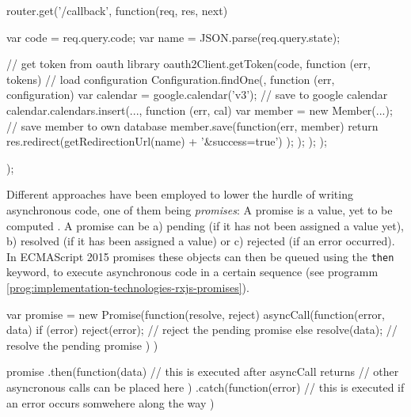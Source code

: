 \begin{program}
\caption{\emph{Callback Hell} -- Nested callbacks in JavaScript. Simplified method taken from a previous project, which authenticates a user, creates a new google calendar for them and then saves the user to one\'s own database, to then redirect them. \texttt{\{...\}} is used to shorten the code, error-handling was also omitted in the example for simplicity.}
\label{prog:implementation-technologies-rxjs-callback-hell}
\begin{JsCode}
router.get('/callback', function(req, res, next) {
  var code = req.query.code;
  var name = JSON.parse(req.query.state);

  // get token from oauth library
  oauth2Client.getToken(code, function (err, tokens) {
    // load configuration
    Configuration.findOne({}, function (err, configuration) {
      var calendar = google.calendar('v3');
      // save to google calendar
      calendar.calendars.insert({...}, function (err, cal) {
        var member = new Member({...});
        // save member to own database
        member.save(function(err, member) {
          return res.redirect(getRedirectionUrl(name) + '&success=true')
        });
      });
    });
  });
});
\end{JsCode}
\end{program}

Different approaches have been employed to lower the hurdle of writing asynchronous code, one of them being \emph{promises}: A promise is a value, yet to be computed \cite{reactive-vs-promises}. A promise can be a) pending (if it has not been assigned a value yet), b) resolved (if it has been assigned a value) or c) rejected (if an error occurred). In ECMAScript 2015 promises these objects can then be queued using the \texttt{then} keyword, to execute asynchronous code in a certain sequence (see programm \ref{prog:implementation-technologies-rxjs-promises}).

\begin{program}
\caption{\emph{Promises} -- Simple example of chaining ECMAScript 2015 promises with \texttt{then} and \texttt{catch}.}
\label{prog:implementation-technologies-rxjs-promises}
\begin{JsCode}
var promise = new Promise(function(resolve, reject) {
  asyncCall(function(error, data) {
    if (error) {
      reject(error); // reject the pending promise
    } else {
      resolve(data); // resolve the pending promise
    }
  })
})

promise
  .then(function(data) {
    // this is executed after asyncCall returns
    // other asyncronous calls can be placed here
  })
  .catch(function(error) {
    // this is executed if an error occurs somwehere along the way
  })
\end{JsCode}
\end{program}

